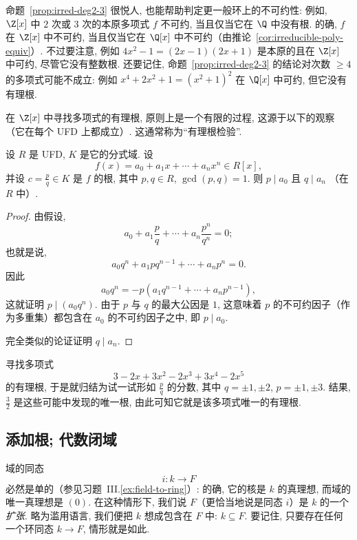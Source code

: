 命题~\ref{prop:irred-deg2-3} 很悦人, 也能帮助判定更一般环上的不可约性: 例如, $\Z[x]$ 中 $2$ 次或 $3$ 次的本原多项式 $f$ 不可约, 当且仅当它在 $\Q$ 中没有根. 的确, $f$ 在 $\Z[x]$ 中不可约, 当且仅当它在 $\Q[x]$ 中不可约（由推论~\ref{cor:irreducible-poly-equiv}）. 不过要注意, 例如 $4x^2-1=(2x-1)(2x+1)$ 是本原的且在 $\Z[x]$ 中可约, 尽管它没有整数根. 还要记住, 命题~\ref{prop:irred-deg2-3} 的结论对次数 $\geq 4$ 的多项式可能不成立: 例如 $x^4+2x^2+1=(x^2+1)^2$ 在 $\Q[x]$ 中可约, 但它没有有理根.

在 $\Z[x]$ 中寻找多项式的有理根, 原则上是一个有限的过程, 这源于以下的观察（它在每个 UFD 上都成立）. 这通常称为``有理根检验''.

\begin{proposition}[有理根检验]\label{prop:rational-root-test}
设 $R$ 是 UFD, $K$ 是它的分式域. 设
\[
f(x)=a_0+a_1x+\cdots+a_nx^n\in R[x],
\]
并设 $c=\frac{p}{q}\in K$ 是 $f$ 的根, 其中 $p,q\in R$, $\gcd(p,q)=1$. 则 $p\mid a_0$ 且 $q\mid a_n$ （在 $R$ 中）.
\end{proposition}

\begin{proof}
由假设,
\[
a_0+a_1\frac{p}{q}+\cdots+a_n\frac{p^n}{q^n}=0;
\]
也就是说,
\[
a_0q^n+a_1pq^{n-1}+\cdots+a_np^n=0.
\]
因此
\[
a_0q^n=-p(a_1q^{n-1}+\cdots+a_np^{n-1}),
\]
这就证明 $p\mid (a_0q^n)$. 由于 $p$ 与 $q$ 的最大公因是 $1$, 这意味着 $p$ 的不可约因子（作为多重集）都包含在 $a_0$ 的不可约因子之中, 即 $p\mid a_0$.

完全类似的论证证明 $q\mid a_n$.
\end{proof}

\begin{example}\label{ex:rational-roots-poly}
寻找多项式
\[
3-2x+3x^2-2x^3+3x^4-2x^5
\]
的有理根, 于是就归结为试一试形如 $\frac{p}{q}$ 的分数, 其中 $q=\pm1,\pm2$, $p=\pm1,\pm3$. 结果, $\frac{3}{2}$ 是这些可能中发现的唯一根, 由此可知它就是该多项式唯一的有理根.
\end{example}

\subsection{添加根; 代数闭域}
\label{subsec:adding-roots}

域的同态
\[
i:k\to F
\]
必然是单的（参见习题~III.\ref{ex:field-to-ring}）: 的确, 它的核是 $k$ 的真理想, 而域的唯一真理想是 $(0)$. 在这种情形下, 我们说 $F$（更恰当地说是同态 $i$）是 $k$ 的一个\emph{扩张}. 略为滥用语言, 我们便把 $k$ 想成包含在 $F$ 中: $k\subseteq F$. 要记住, 只要存在任何一个环同态 $k\to F$, 情形就是如此.

